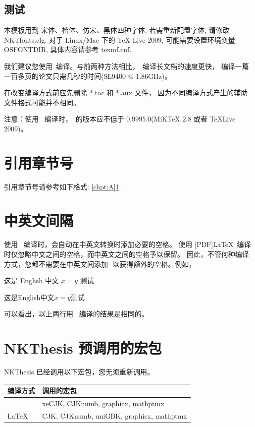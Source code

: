 \subsection{测试}

本模板用到 宋体、楷体、仿宋、黑体四种字体. 若需重新配置字体, 请修改 NKTfonts.cfg.
对于 Linux/Mac 下的 TeX Live 2009, 可能需要设置环境变量 OSFONTDIR, 具体内容请参考 texmf.cnf.


我们建议您使用\XeLaTeX\ 编译。与前两种方法相比，\XeLaTeX\  编译长文档的速度更快，
编译一篇一百多页的论文只需几秒的时间(SL9400 @ 1.86GHz)。

在改变编译方式前应先删除 *.toc 和 *.aux 文件，
因为不同编译方式产生的辅助文件格式可能并不相同。



注意：使用 \XeLaTeX\ 编译时，\XeTeX\ 的版本应不低于 0.9995.0(MiKTeX 2.8 或者 TeXLive 2009)。


\section{引用章节号}
\label{sec:ex:A}

引用章节号请参考如下格式: \ref{chpt:A}\ref{sec:ex:A}.


\section{中英文间隔}

使用 \XeLaTeX\ 编译时，会自动在中英文转换时添加必要的空格。 使用 [PDF]\LaTeX\
编译时仅忽略中文之间的空格，而中英文之间的空格予以保留。
因此，不管何种编译方式，您都不需要在中英文间添加 $\tilde{}$ 以获得额外的空格。例如，

这是 English 中文 $x=y$ 测试

这是English中文$x=y$测试

可以看出，以上两行用 \XeLaTeX\ 编译的结果是相同的。


\section{NKThesis 预调用的宏包}

NKThesis 已经调用以下宏包，您无须重新调用。

\begin{center}
\begin{tabular}{l|l}
\hline
编译方式 & 调用的宏包\\ \hline
\XeLaTeX & xeCJK, CJKnumb, graphicx, mathptmx \\ \hline
[PDF]\LaTeX & CJK, CJKnumb, uniGBK, graphicx, mathptmx \\
\hline
\end{tabular}
\end{center}



